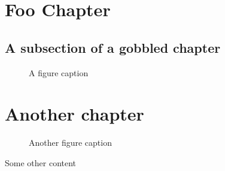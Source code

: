 \documentclass{book}
\newcommand{\counterwithoutwrapper}[2]{%
  \counterwithout{#2}{#1}%
}
\newif\ifnogobblechapter
\begin{document}
\ifnogobblechapter
\else
{}
\fi

\tableofcontents

\chapter[Foo entry to ToC]{Foo Chapter}

\section{A subsection of a gobbled chapter}

\begin{figure}
  \caption{A figure caption}
\end{figure}

\chapter{Another chapter}

\begin{figure}
  \caption{Another figure caption}
\end{figure}

Some other content
\end{document}
